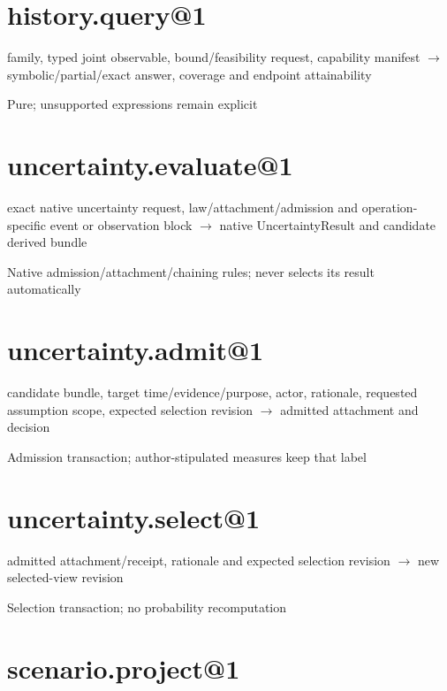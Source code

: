 \hypertarget{history.query1}{%
\section{history.query@1}\label{history.query1}}

family, typed joint observable, bound/feasibility request, capability manifest \ensuremath{\rightarrow} symbolic/partial/exact answer, coverage and endpoint attainability

Pure; unsupported expressions remain explicit

\hypertarget{uncertainty.evaluate1}{%
\section{uncertainty.evaluate@1}\label{uncertainty.evaluate1}}

exact native uncertainty request, law/attachment/admission and operation-specific event or observation block \ensuremath{\rightarrow} native UncertaintyResult and candidate derived bundle

Native admission/attachment/chaining rules; never selects its result automatically

\hypertarget{uncertainty.admit1}{%
\section{uncertainty.admit@1}\label{uncertainty.admit1}}

candidate bundle, target time/evidence/purpose, actor, rationale, requested assumption scope, expected selection revision \ensuremath{\rightarrow} admitted attachment and decision

Admission transaction; author-stipulated measures keep that label

\hypertarget{uncertainty.select1}{%
\section{uncertainty.select@1}\label{uncertainty.select1}}

admitted attachment/receipt, rationale and expected selection revision \ensuremath{\rightarrow} new selected-view revision

Selection transaction; no probability recomputation

\hypertarget{scenario.project1}{%
\section{scenario.project@1}\label{scenario.project1}}


